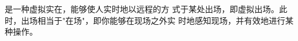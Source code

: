 
\item [远程呈现(telepresence)] 是一种虚拟实在，能够使人实时地以远程的方
式于某处出场，即虚拟出场。此时，出场相当于"在场"，即你能够在现场之外实
时地感知现场，并有效地进行某种操作。

